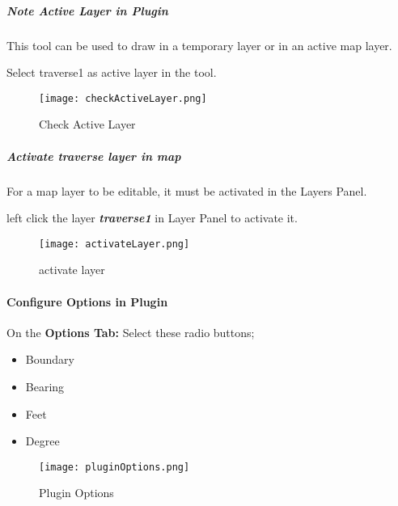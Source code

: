 \clearpage

\subparagraph*{Note Active Layer in Plugin}
\vspace{.2in}
  
This tool can be used to draw in a temporary layer or in an active map layer.
\vspace{.2in}

\noindent Select traverse1 as active layer in the tool.
\vspace{.2in}

\begin{figure}[H] %
\centering
    \texttt{[image: checkActiveLayer.png]}
\vspace{-.2in}

\caption{Check Active Layer}
\end{figure}

\clearpage
\subparagraph*{Activate traverse layer in map}
\vspace{.2in}

For a map layer to be editable, it must be activated in the Layers Panel.
\vspace{.2in}

 left click the layer \textbf {\emph{traverse1}} in Layer Panel to activate it.
\vspace{.2in}

\begin{figure}[H] %
\centering
    \texttt{[image: activateLayer.png]}
\vspace{-.1in}

\caption{activate layer}
\end{figure}

\clearpage

\paragraph*{Configure Options in Plugin}
\vspace{.5in}

\large On the \textbf{Options Tab:} Select these radio buttons;
\begin{itemize}
\item Boundary
\item Bearing
\item Feet
\item Degree
\end{itemize}
\begin{figure}[H]
\centering
    \texttt{[image: pluginOptions.png]}
\vspace{-.2in}

\caption{Plugin Options}
\end{figure}
\clearpage

